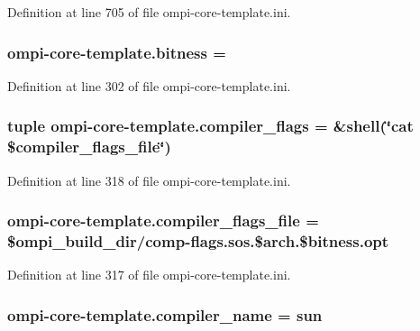 Definition at line 705 of file ompi-\/core-\/template.\-ini.

\hypertarget{namespaceompi-core-template_a33886dd20e2ff716e34eaa7ef4ca4af2}{
\subsubsection[{bitness}]{\setlength{\rightskip}{0pt plus 5cm}ompi-\/core-\/template.\-bitness =}}\label{namespaceompi-core-template_a33886dd20e2ff716e34eaa7ef4ca4af2}


Definition at line 302 of file ompi-\/core-\/template.\-ini.

\hypertarget{namespaceompi-core-template_a5b2489e93c91084486e1d16ae13723b8}{
\subsubsection[{compiler\-\_\-flags}]{\setlength{\rightskip}{0pt plus 5cm}tuple ompi-\/core-\/template.\-compiler\-\_\-flags = \&shell(\char`\"{}cat \${\bf compiler\-\_\-flags\-\_\-file}\char`\"{})}}\label{namespaceompi-core-template_a5b2489e93c91084486e1d16ae13723b8}


Definition at line 318 of file ompi-\/core-\/template.\-ini.

\hypertarget{namespaceompi-core-template_aa07e281cdd8bbbdaa204857ffbffea46}{
\subsubsection[{compiler\-\_\-flags\-\_\-file}]{\setlength{\rightskip}{0pt plus 5cm}ompi-\/core-\/template.\-compiler\-\_\-flags\-\_\-file = \${\bf ompi\-\_\-build\-\_\-dir}/comp-\/flags.\-sos.\$arch.\$bitness.\-opt}}\label{namespaceompi-core-template_aa07e281cdd8bbbdaa204857ffbffea46}


Definition at line 317 of file ompi-\/core-\/template.\-ini.

\hypertarget{namespaceompi-core-template_a5b83ee824af44e042ab01020557d1718}{
\subsubsection[{compiler\-\_\-name}]{\setlength{\rightskip}{0pt plus 5cm}ompi-\/core-\/template.\-compiler\-\_\-name = sun}}\label{namespaceompi-core-template_a5b83ee824af44e042ab01020557d1718}


